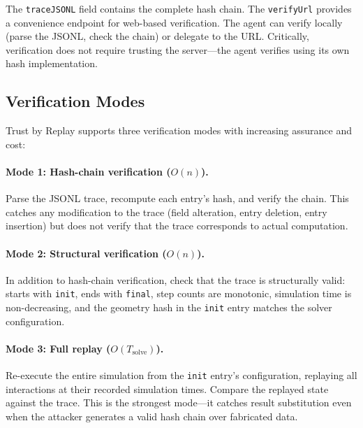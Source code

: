 \documentclass[letterpaper,twocolumn,10pt]{article}
\begin{document}
\noindent The \texttt{traceJSONL} field contains the complete hash chain. The
\texttt{verifyUrl} provides a convenience endpoint for web-based verification.
The agent can verify locally (parse the JSONL, check the chain) or delegate
to the URL. Critically, verification does not require trusting the server---the
agent verifies using its own hash implementation.

\subsection{Verification Modes}

Trust by Replay supports three verification modes with increasing assurance
and cost:

\paragraph{Mode 1: Hash-chain verification ($O(n)$).} Parse the JSONL trace,
recompute each entry's hash, and verify the chain. This catches any
modification to the trace (field alteration, entry deletion, entry insertion)
but does not verify that the trace corresponds to actual computation.

\paragraph{Mode 2: Structural verification ($O(n)$).} In addition to
hash-chain verification, check that the trace is structurally valid: starts
with \texttt{init}, ends with \texttt{final}, step counts are monotonic,
simulation time is non-decreasing, and the geometry hash in the \texttt{init}
entry matches the solver configuration.

\paragraph{Mode 3: Full replay ($O(T_{\text{solve}})$).} Re-execute the
entire simulation from the \texttt{init} entry's configuration, replaying all
interactions at their recorded simulation times. Compare the replayed state
against the trace. This is the strongest mode---it catches result substitution
even when the attacker generates a valid hash chain over fabricated data.
\end{document}

